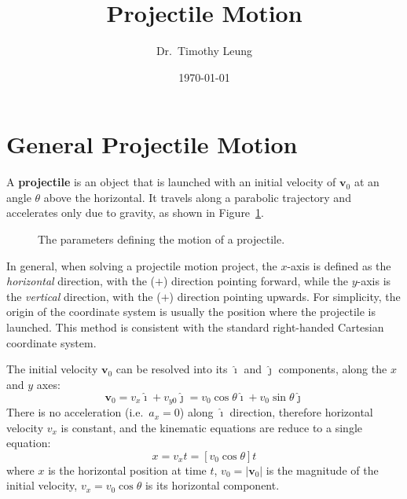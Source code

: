 \documentclass{../../../oss-handout}
\title{Projectile Motion}
\author{Dr.\ Timothy Leung}
\date{\today}
\newcommand{\iii}{\bm{\hat{\imath}}}
\newcommand{\jjj}{\bm{\hat{\jmath}}}
\begin{document}
\thispagestyle{title}
\gentitle

\section{General Projectile Motion}
A \textbf{projectile} is an object that is launched with an initial velocity
of $\bm{v}_0$ at an angle $\theta$ above the horizontal. It travels along a
parabolic trajectory and accelerates only due to gravity, as shown in
Figure~\ref{fig:projectile}. 
\begin{figure}[ht]
  \centering
  \caption{The parameters defining the motion of a projectile.}
  \label{fig:projectile}
\end{figure}

In general, when solving a projectile motion project, the $x$-axis is defined
as the \emph{horizontal} direction, with the ($+$) direction pointing forward,
while the $y$-axis is the \emph{vertical} direction, with the ($+$) direction
pointing upwards. For simplicity, the origin of the coordinate system is usually
the position where the projectile is launched. This method is consistent with
the standard right-handed Cartesian coordinate system.

The initial velocity $\bm{v}_0$ can be resolved into its $\iii$ and $\jjj$
components, along the $x$ and $y$ axes:%
\begin{equation}
  \bm{v}_0
  =v_x\iii+v_{y0}\jjj
  =v_0\cos\theta\iii + v_0\sin\theta\jjj
\end{equation}
There is no acceleration (i.e.\ $a_x=0$) along $\iii$ direction, therefore
horizontal velocity $v_x$ is constant, and the kinematic equations are reduce
to a single equation:
\begin{equation}
  x=v_xt=\left[v_0\cos\theta\right] t
  \label{eq:x}
\end{equation}
where $x$ is the horizontal position at time $t$, $v_0=|\bm{v}_0|$ is the
magnitude of the initial velocity, $v_x=v_0\cos\theta$ is its horizontal
component.
\end{document}
